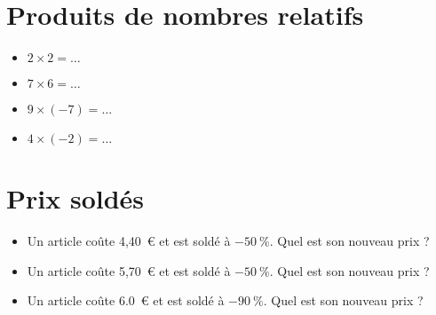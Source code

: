 \documentclass[a4paper,11pt,fleqn]{article}
\begin{document}
\section{Produits de nombres relatifs}
\begin{itemize}

  \item $2\times2=\ldots$
  \item $7\times6=\ldots$
  \item $9\times(-7)=\ldots$
  \item $4\times(-2)=\ldots$
\end{itemize}


\section{Prix soldés}
\begin{itemize}

  \item Un article coûte 4,40~€ et est soldé à $-50~\%$. Quel est son nouveau prix ?
  \item Un article coûte 5,70~€ et est soldé à $-50~\%$. Quel est son nouveau prix ?
  \item Un article coûte 6.0~€ et est soldé à $-90~\%$. Quel est son nouveau prix ?
\end{itemize}
\end{document}
